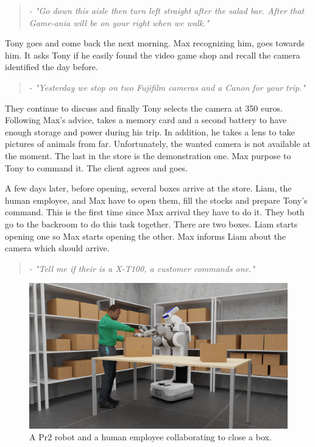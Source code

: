 \begin{quote} 
\centering 
\textit{
- "Go down this aisle then turn left straight after the salad bar. After that Game-ania will be on your right when we walk."}
\end{quote}

Tony goes and come back the next morning. Max recognizing him, goes towards him. It asks Tony if he easily found the video game shop and recall the camera identified the day before.

\begin{quote} 
\centering 
\textit{
- "Yesterday we stop on two Fujifilm cameras and a Canon for your trip."}
\end{quote}

They continue to discuss and finally Tony selects the camera at 350 euros. Following Max's advice, takes a memory card and a second battery to have enough storage and power during his trip. In addition, he takes a lens to take pictures of animals from far. Unfortunately, the wanted camera is not available at the moment. The last in the store is the demonstration one. Max purpose to Tony to command it. The client agrees and goes.

A few days later, before opening, several boxes arrive at the store. Liam, the human employee, and Max have to open them, fill the stocks and prepare Tony's command. This is the first time since Max arrival they have to do it. They both go to the backroom to do this task together. There are two boxes. Liam starts opening one so Max starts opening the other. Max informs Liam about the camera which should arrive.

\begin{quote} 
\centering 
\textit{
- "Tell me if their is a X-T100, a customer commands one."}
\end{quote}

\begin{figure}[h!]
\centering
\includegraphics[width=\textwidth]{figures/introduction/camera_store_3.png}
\caption{\label{fig:cam_store} A Pr2 robot and a human employee collaborating to close a box. }
\end{figure}

